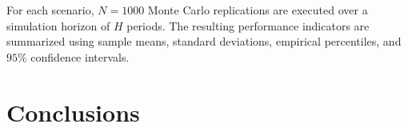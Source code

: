 \documentclass[a4paper,fleqn]{cas-dc}
\begin{document}
For each scenario, \(N=1000\) Monte Carlo replications are executed over a simulation horizon of \(H\) periods. The resulting performance indicators are summarized using sample means, standard deviations, empirical percentiles, and \(95\%\) confidence intervals.





\section{Conclusions}
\label{conclusions}


















































\end{document}
